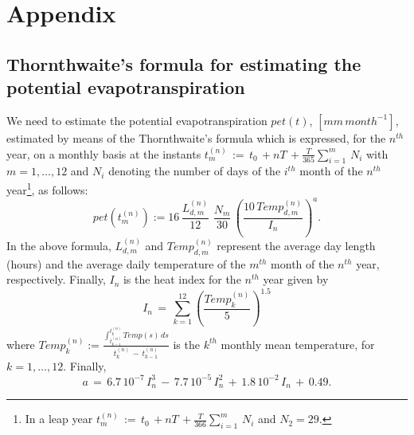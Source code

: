 \clearpage
\section{Appendix}
\subsection{Thornthwaite's formula  for estimating the potential evapotranspiration }
 We need to estimate the 
      potential evapotranspiration  $pet(t)$, $[mm \, month^{-1}]$, estimated by means of the Thornthwaite's formula which is expressed, for the $n^{th}$ year, on a  monthly basis at the instants  $t_{m}^{(n)}\,:=\, t_0\,+nT\,+ \displaystyle \frac{T}{365} \displaystyle \sum_{i=1}^{m}\, N_i$ with $m = 1,\dots, 12$  and  $N_i$ denoting  the number of days of the $i^{th}$ month of the $n^{th}$ year\footnote{In a leap year $t_{m}^{(n)}\,:=\, t_0\,+nT\,+ \displaystyle \frac{T}{366} \displaystyle \sum_{i=1}^{m}\, N_i$  and $N_2=29$.}, as follows: 
     $$
     pet(t_{m}^{(n)}):= 16\, \displaystyle \frac{L_{d,m}^{(n)}}{12}\,\, \displaystyle \frac{N_m}{30} \,\left(\displaystyle \frac{10 \, Temp_{d,m}^{(n)} }{I_n}\right)^a. 
     $$
  In the above formula,  $L_{d,m}^{(n)}$ and $Temp_{d,m}^{(n)}$  represent  the average day length (hours) and the average daily temperature  of the  $m^{th}$ month of the $n^{th}$ year, respectively. Finally, $I_n$ is the heat index for the $n^{th}$ year given by 
     $$
     I_n\,=\, \displaystyle \sum_{k=1}^{12} \left(\displaystyle \frac{Temp_k^{(n)}}{5}\right)^{1.5}
     $$ 
     where $Temp_k^{(n)}:= \displaystyle \frac{\displaystyle \int_{t_{k-1}^{(n)}}^{t_{k}^{(n)}} Temp(s) \, ds}{t_{k}^{(n)}\,-\, t_{k-1}^{(n)}}$ is the $k^{th}$ monthly mean temperature, for $k=1,\dots, 12$. Finally,
     $$a\,=\, 6.7\, 10^{-7}\, I_n^3\,-\, 7.7 \, 10^{-5} \, I_n^2\, +\, 1.8\,  10^{-2} \, I_n \,+\, 0.49.$$
     
